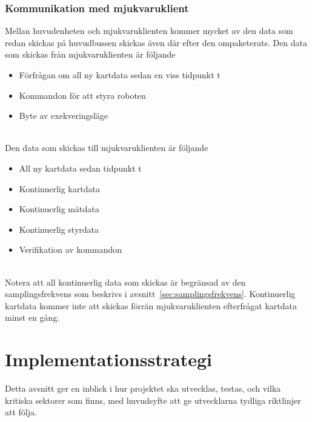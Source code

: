 \documentclass{article}
\begin{document}
\subsubsection{Kommunikation med mjukvaruklient}
Mellan huvudenheten och mjukvaruklienten kommer mycket av den data som redan skickas på huvudbussen skickas även där efter den ompaketerats.
\newline\newline
Den data som skickas från mjukvaruklienten är följande
\begin{itemize}
\item Förfrågan om all ny kartdata sedan en viss tidpunkt t
\item Kommandon för att styra roboten
\item Byte av exekveringsläge
\end{itemize}
\ \\
Den data som skickas till mjukvaruklienten är följande
\begin{itemize}
\item All ny kartdata sedan tidpunkt t
\item Kontinuerlig kartdata
\item Kontinuerlig mätdata
\item Kontinuerlig styrdata
\item Verifikation av kommandon
\end{itemize}
\ \\
Notera att all kontinuerlig data som skickas är begränsad av den samplingsfrekvens som beskrivs i avsnitt~\ref{sec:samplingsfrekvens}. Kontinuerlig kartdata kommer inte att skickas förrän mjukvaruklienten efterfrågat kartdata minst en gång.

\clearpage

\section{Implementationsstrategi}
Detta avsnitt ger en inblick i hur projektet ska utvecklas, testas, och vilka kritiska sektorer som finns, med huvudsyfte att ge utvecklarna tydliga riktlinjer att följa.
\end{document}
